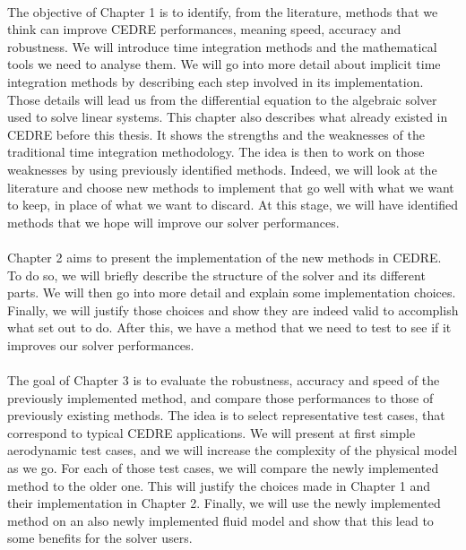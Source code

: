     \paragraph{}
    The objective of Chapter 1 is to identify, from the literature, methods that we think can improve CEDRE performances, meaning speed, accuracy and robustness.
    We will introduce time integration methods and the mathematical tools we need to analyse them.
    We will go into more detail about implicit time integration methods by describing each step involved in its implementation.
    Those details will lead us from the differential equation to the algebraic solver used to solve linear systems.
    This chapter also describes what already existed in CEDRE before this thesis.
    It shows the strengths and the weaknesses of the traditional time integration methodology.
    The idea is then to work on those weaknesses by using previously identified methods.
    Indeed, we will look at the literature and choose new methods to implement that go well with what we want to keep, in place of what we want to discard.
    At this stage, we will have identified methods that we hope will improve our solver performances.

    \paragraph{}
    Chapter 2 aims to present the implementation of the new methods in CEDRE.
    To do so, we will briefly describe the structure of the solver and its different parts.
    We will then go into more detail and explain some implementation choices.
    Finally, we will justify those choices and show they are indeed valid to accomplish what set out to do.
    After this, we have a method that we need to test to see if it improves our solver performances.

    \paragraph{}
    The goal of Chapter 3 is to evaluate the robustness, accuracy and speed of the previously implemented method, and compare those performances to those of previously existing methods.
    The idea is to select representative test cases, that correspond to typical CEDRE applications.
    We will present at first simple aerodynamic test cases, and we will increase the complexity of the physical model as we go.
    For each of those test cases, we will compare the newly implemented method to the older one.
    This will justify the choices made in Chapter 1 and their implementation in Chapter 2.
    Finally, we will use the newly implemented method on an also newly implemented fluid model and show that this lead to some benefits for the solver users.

